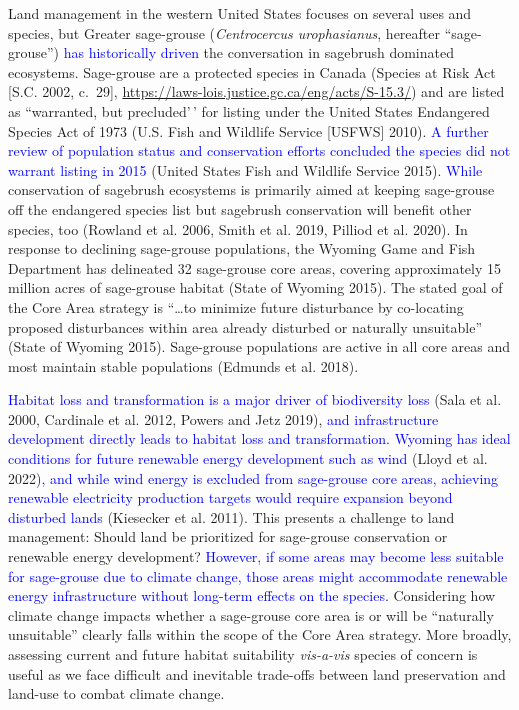 \documentclass[
  12pt,
]{article}
\begin{document}
Land management in the western United States focuses on several uses and species, but Greater sage-grouse (\emph{Centrocercus urophasianus}, hereafter ``sage-grouse'') \textcolor{blue}{has historically driven} the conversation in sagebrush dominated ecosystems.
Sage-grouse are a protected species in Canada (Species at Risk Act {[}S.C. 2002, c.~29{]}, \url{https://laws-lois.justice.gc.ca/eng/acts/S-15.3/}) and are listed as ``warranted, but precluded'\,' for listing under the United States Endangered Species Act of 1973 (U.S. Fish and Wildlife Service
{[}USFWS{]} 2010).
\textcolor{blue}{A further review of population status and conservation efforts concluded the species did not warrant listing in 2015} (United States Fish and Wildlife Service 2015).
\textcolor{blue}{While} conservation of sagebrush ecosystems is primarily aimed at keeping sage-grouse off the endangered species list but sagebrush conservation will benefit other species, too (Rowland et al. 2006, Smith et al. 2019, Pilliod et al. 2020).
In response to declining sage-grouse populations, the Wyoming Game and Fish Department has delineated 32 sage-grouse core areas, covering approximately 15 million acres of sage-grouse habitat (State of Wyoming 2015).
The stated goal of the Core Area strategy is ``\ldots to minimize future disturbance by co-locating proposed disturbances within area already disturbed or naturally unsuitable'' (State of Wyoming 2015).
Sage-grouse populations are active in all core areas and most maintain stable populations (Edmunds et al. 2018).

\textcolor{blue}{Habitat loss and transformation is a major driver of biodiversity loss} (Sala et al. 2000, Cardinale et al. 2012, Powers and Jetz 2019), \textcolor{blue}{and infrastructure development directly leads to habitat loss and transformation.}
\textcolor{blue}{Wyoming has ideal conditions for future renewable energy development such as wind} (Lloyd et al. 2022)\textcolor{blue}{, and while wind energy is excluded from sage-grouse core areas, achieving renewable electricity production targets would require expansion beyond disturbed lands} (Kiesecker et al. 2011).
This presents a challenge to land management: Should land be prioritized for sage-grouse conservation or renewable energy development?
\textcolor{blue}{However, if some areas may become less suitable for sage-grouse due to climate change, those areas might accommodate renewable energy infrastructure without long-term effects on the species.}
Considering how climate change impacts whether a sage-grouse core area is or will be ``naturally unsuitable'' clearly falls within the scope of the Core Area strategy.
More broadly, assessing current and future habitat suitability \emph{vis-a-vis} species of concern is useful as we face difficult and inevitable trade-offs between land preservation and land-use to combat climate change.
\end{document}

